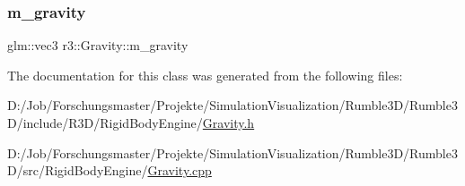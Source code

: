 \subsubsection{\texorpdfstring{m\+\_\+gravity}{m\_gravity}}
{\footnotesize\ttfamily glm\+::vec3 r3\+::\+Gravity\+::m\+\_\+gravity\hspace{0.3cm}{\ttfamily [protected]}}



The documentation for this class was generated from the following files\+:\begin{DoxyCompactItemize}
\item 
D\+:/\+Job/\+Forschungsmaster/\+Projekte/\+Simulation\+Visualization/\+Rumble3\+D/\+Rumble3\+D/include/\+R3\+D/\+Rigid\+Body\+Engine/\mbox{\hyperlink{_gravity_8h}{Gravity.\+h}}\item 
D\+:/\+Job/\+Forschungsmaster/\+Projekte/\+Simulation\+Visualization/\+Rumble3\+D/\+Rumble3\+D/src/\+Rigid\+Body\+Engine/\mbox{\hyperlink{_gravity_8cpp}{Gravity.\+cpp}}\end{DoxyCompactItemize}
